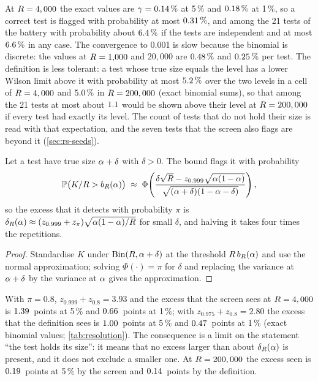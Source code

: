 At $R=4,000{}$ the exact values are $\gamma=0.14\,\%$ at 5\,\% and $0.18\,\%$ at 1\,\%, so a correct test is flagged with probability at most $0.31\,\%$, and among the 21 tests of the battery with probability about $6.4\,\%$ if the tests are independent and at most $6.6\,\%$ in any case.
The convergence to 0.001 is slow because the binomial is discrete: the values at $R=1{,}000$ and $20{,}000$ are $0.48\,\%$ and $0.25\,\%$ per test.
The definition is less tolerant: a test whose true size equals the level has a lower Wilson limit above it with probability at most $5.2\,\%$ over the two levels in a cell of $R=4,000{}$ and $5.0\,\%$ in $R=200,000{}$ (exact binomial sums), so that among the 21 tests at most about $1.1$ would be shown above their level at $R=200,000{}$ if every test had exactly its level.
The count of tests that do not hold their size is read with that expectation, and the seven tests that the screen also flags are beyond it (\cref{sec:rs-seeds}).

\begin{proposition}[Resolution]
\label{prop:resolution}
Let a test have true size $\alpha+\delta$ with $\delta>0$. The bound flags it with probability
\begin{equation}
\mathbb{P}\big(K/R>b_R(\alpha)\big)\;\approx\;\Phi\!\left(\frac{\delta\sqrt{R}-z_{0.999}\sqrt{\alpha(1-\alpha)}}{\sqrt{(\alpha+\delta)(1-\alpha-\delta)}}\right),
\label{eq:resolution}
\end{equation}
so the excess that it detects with probability $\pi$ is $\delta_R(\alpha)\approx(z_{0.999}+z_\pi)\sqrt{\alpha(1-\alpha)/R}$ for small $\delta$, and halving it takes four times the repetitions.
\end{proposition}
\begin{proof}
Standardise $K$ under $\operatorname{Bin}(R,\alpha+\delta)$ at the threshold $R\,b_R(\alpha)$ and use the normal approximation; solving $\Phi(\cdot)=\pi$ for $\delta$ and replacing the variance at $\alpha+\delta$ by the variance at $\alpha$ gives the approximation.
\end{proof}

With $\pi=0.8$, $z_{0.999}+z_{0.8}=3.93$ and the excess that the screen sees at $R=4,000{}$ is $1.39\,$ points at 5\,\% and $0.66\,$ points at 1\,\%; with $z_{0.975}+z_{0.8}=2.80$ the excess that the definition sees is $1.00\,$ points at 5\,\% and $0.47\,$ points at 1\,\% (exact binomial values; \cref{tab:resolution}).
The consequence is a limit on the statement ``the test holds its size'': it means that no excess larger than about $\delta_R(\alpha)$ is present, and it does not exclude a smaller one.
At $R=200,000{}$ the excess seen is $0.19\,$ points at 5\,\% by the screen and $0.14\,$ points by the definition.

